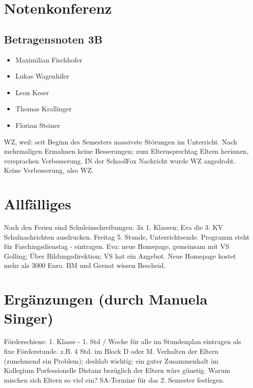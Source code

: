 \documentclass[pdftex,a4paper,12pt,bibliography=totoc]{scrartcl}
\begin{document}
\section{Notenkonferenz}
\label{sec:org7147ae9}

\subsection{Betragensnoten 3B}
\label{sec:org4bb2e20}

\begin{itemize}
 \item Maximilian Fischhofer
 \item Lukas Wagenhifer
 \item Leon Keser
 \item Thomas Krallinger
 \item Florian Steiner
\end{itemize}

WZ, weil: seit Beginn des Semesters massivste Störungen im Unterricht. Nach mehrmaligen Ermahnen keine Besserungen; zum Elternsprechtag Eltern herinnen, versprachen Verbesserung. IN der SchoolFox Nachricht wurde WZ angedroht. Keine Verbesserung, also WZ.

\section{Allfälliges}
\label{sec:org7efa80f}
Nach den Ferien sind Schuleinschreibungen: 3x 1. Klassen; Eva die 3. KV
\newline
Schulnachrichten ausdrucken.
\newline
Freitag 5. Stunde, Unterrichtsende.
\newline
Programm steht für Faschingsdienstag - eintragen.
\newline
Eva: neue Homepage, gemeinsam mit VS Golling; Über Bildungsdirektion; VS hat ein Angebot. Neue Homepage kostet mehr als 3000 Euro. BM und Gernot wissen Bescheid. 

\section{Ergänzungen (durch Manuela Singer)}
\label{sec:org94a60f2}

Förderschiene: 1. Klasse - 1. Std / Woche für alle im Stundenplan eintragen als fixe Förderstunde. z.B. 4 Std. im Block D oder M.
\newline
Verhalten der Eltern (zunehmend ein Problem); deshlab wichtig: ein guter Zusammenhalt im Kollegium
\newline
Porfessionelle Distanz bezüglich der Eltern wäre günstig. Warum mischen sich Eltern so viel ein?
\newline
SA-Termine für das 2. Semester festlegen.
\end{document}
